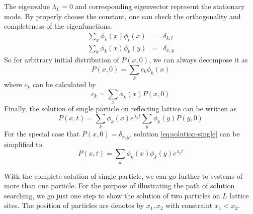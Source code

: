 \documentclass[12pt,a4paper]{article}
\begin{document}
The eigenvalue $\lambda_L = 0$ and corresponding eigenvector represent the
stationary mode. By properly choose the constant, one can check the
orthogonality and completeness of the eigenfunctions. 
\begin{eqnarray}
    \label{eq:orthogonality}
    \sum_{x} \phi_k(x)\phi_l(x) & = & \delta_{k,l} \\
    \label{eq:completeness}
    \sum_{k} \phi_k(x)\phi_k(y) & = & \delta_{x,y} 
\end{eqnarray}
So for arbitrary initial distribution of $P(x, 0)$, we can always decompose it as 
\begin{equation}
    \label{eq:decompose-intial-single}
    P(x,0) = \sum_k{c_k \phi_k(x)}
\end{equation}
where $c_k$ can be calculated by 
\begin{equation}
    \label{eq:coeff-k}
    c_k = \sum_x{\phi_k(x) P(x,0)}
\end{equation}
Finally, the solution of single particle on reflecting lattice can be written as
\begin{equation}
    \label{eq:solution-single}
    P(x,t) = \sum_k{\phi_k(x)e^{\lambda_k t}}\sum_y{\phi_k(y)P(y,0)}
\end{equation}
For the special case that $P(x,0) = \delta_{x,y}$, solution
\eqref{eq:solution-single} can be simplified to
\begin{equation}
    \label{eq:solution-single-simplified}
    P(x,t) = \sum_k{\phi_k(x)\phi_k(y)e^{\lambda_k t}}
\end{equation}

With the complete solution of single particle, we can go further to systems of
more than one particle. For the purpose of illustrating the path of solution
searching, we go just one step to show the solution of two particles on $L$
lattice sites. The position of particles are denotes by $x_1, x_2$ with
constraint $x_1<x_2$.





% 
 
\end{document}
